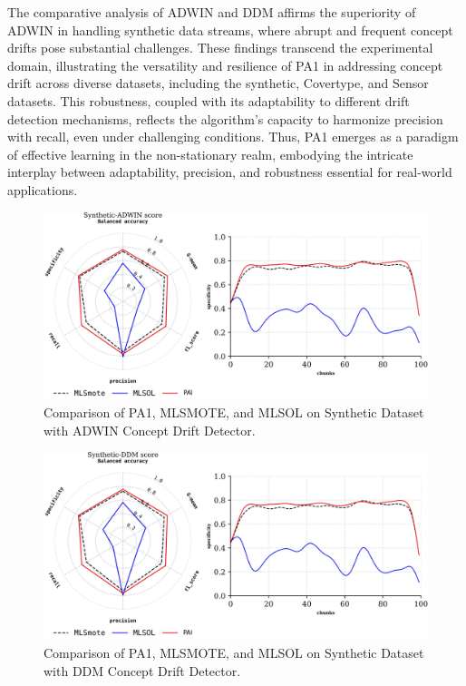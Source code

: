 The comparative analysis of ADWIN and DDM affirms the superiority of ADWIN in handling synthetic data streams, where abrupt and frequent concept drifts pose substantial challenges. These findings transcend the experimental domain, illustrating the versatility and resilience of PA1 in addressing concept drift across diverse datasets, including the synthetic, Covertype, and Sensor datasets. This robustness, coupled with its adaptability to different drift detection mechanisms, reflects the algorithm's capacity to harmonize precision with recall, even under challenging conditions. Thus, PA1 emerges as a paradigm of effective learning in the non-stationary realm, embodying the intricate interplay between adaptability, precision, and robustness essential for real-world applications.

\begin{figure}[!ht]
	\centering
	\includegraphics[width=1\linewidth]{4_Imbalanced/figures/exp_5.png}
  \caption{Comparison of PA1, MLSMOTE, and MLSOL on Synthetic Dataset with ADWIN Concept Drift Detector.}
	\label{fig:4_first_proposal_result_exp_5}
\end{figure}

\begin{figure}[!ht]
	\centering
	\includegraphics[width=1\linewidth]{4_Imbalanced/figures/exp_6.png}
  \caption{Comparison of PA1, MLSMOTE, and MLSOL on Synthetic Dataset with DDM Concept Drift Detector.}
	\label{fig:4_first_proposal_result_exp_6}
\end{figure}


